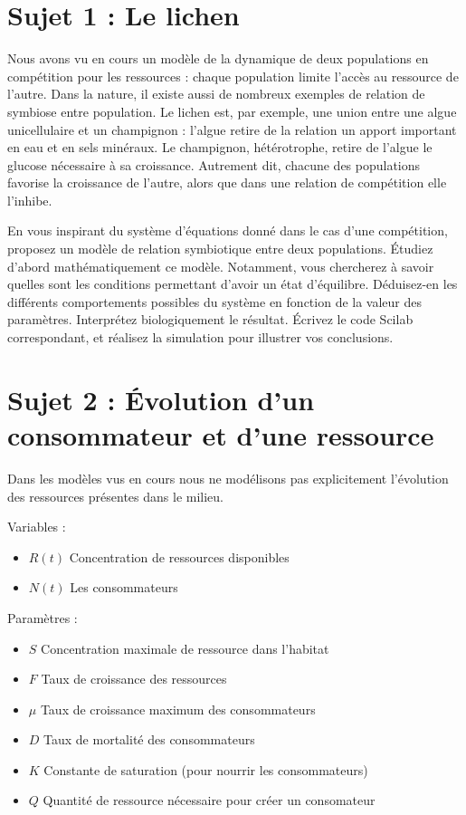\documentclass[12pt,a4paper]{article}
\begin{document}
\section*{Sujet 1 : Le lichen}

Nous avons vu en cours un modèle de la dynamique de deux populations en compétition
pour les ressources : chaque population limite l'accès au ressource de l'autre.
Dans la nature, il existe aussi de nombreux exemples de relation de symbiose entre population.
Le lichen est, par exemple, une union entre une algue unicellulaire et un champignon :
l'algue retire de la relation un apport important en eau et en sels minéraux. Le champignon,
hétérotrophe, retire de l'algue le glucose nécessaire à sa croissance. Autrement dit, chacune
des populations favorise la croissance de l'autre, alors que dans une relation de compétition
elle l'inhibe.


En vous inspirant du système d'équations donné dans le cas d'une compétition, proposez un
modèle de relation symbiotique entre deux populations. Étudiez d'abord mathématiquement
ce modèle. Notamment, vous chercherez à savoir quelles sont les conditions permettant d'avoir
un état d'équilibre. Déduisez-en les différents comportements possibles du système en fonction
de la valeur des paramètres. Interprétez biologiquement le résultat. Écrivez le code Scilab
correspondant, et réalisez la simulation pour illustrer vos conclusions.

\section*{Sujet 2 : Évolution d'un consommateur et d'une ressource}

Dans les modèles vus en cours nous ne modélisons pas explicitement l'évolution des ressources présentes dans le milieu.

Variables : 
\begin{itemize}
\item $R(t)$ Concentration de ressources disponibles
\item $N(t)$ Les consommateurs
\end{itemize}

Paramètres : 
\begin{itemize}
\item $S$ Concentration maximale de ressource dans l'habitat

\item $F$ Taux de croissance des ressources
\item $\mu$ Taux de croissance maximum des consommateurs
\item $D$ Taux de mortalité des consommateurs
\item $K$ Constante de saturation (pour nourrir les consommateurs)
\item $Q$ Quantité de ressource nécessaire pour créer un consomateur
\end{itemize}
\end{document}
